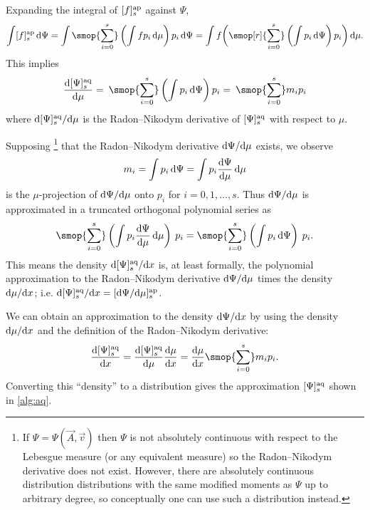 Expanding the integral of \(  \ff[a]{f}{s} \) against \( \Psi \), 
\begin{equation*}
    \int \ff[a]{f}{s} \,\d\Psi
    = \int \smop{\sum_{i=0}^{s}} \left(\int f p_i \,\d\mu\right) p_i \,\d\Psi
    = \int f  \bigg( \smop[r]{\sum_{i=0}^{s}} \left(\int p_i \,\d\Psi\right) p_i \bigg) \,\d\mu.
\end{equation*}
This implies 
\begin{equation*}
    \frac{\d\qq[a]{\Psi}{s}}{\d\mu} 
    = \:\smop{\sum_{i=0}^{s}} \left( \int p_i \,\d\Psi \right) p_i 
    = \:\smop{\sum_{i=0}^{s}} m_i p_i 
\end{equation*}
where \( \d\qq[a]{\Psi}{s}/\d\mu \) is the Radon--Nikodym derivative of \( \qq[a]{\Psi}{s} \) with respect to \( \mu \).


Supposing%
\footnote{If \( \Psi = \Psi(\vec{A},\vec{v}) \) then \( \Psi \) is not absolutely continuous with respect to the Lebesgue measure (or any equivalent measure) so the Radon--Nikodym derivative does not exist. 
However, there are absolutely continuous distribution distributions with the same modified moments as \( \Psi \) up to arbitrary degree, so conceptually one can use such a distribution instead.}
that the Radon--Nikodym derivative \( \textup{d}\Psi/\textup{d}\mu \) exists, we observe 
\begin{equation*}
    m_i = \int p_i \,\textup{d}\Psi
    = \int p_i \frac{\textup{d}\Psi}{\textup{d}\mu} \,\textup{d}\mu
\end{equation*}
is the \( \mu \)-projection of \( \textup{d}\Psi/\textup{d}\mu \) onto \( p_i \) for \( i=0,1,\ldots, s \). 
Thus \( \textup{d}\Psi/\textup{d}\mu \) is approximated in a truncated orthogonal polynomial series as
\begin{equation*}
    \smop{\sum_{i=0}^{s}} \left( \int p_i \frac{\d\Psi}{\d\mu} \,\d\mu \right) \: p_i
    =
    \smop{\sum_{i=0}^{s}} \left( \int p_i \,\d\Psi \right) \: p_i.
\end{equation*}
This means the density \( \d\qq[a]{\Psi}{s}/\d{x} \) is, at least formally, the polynomial approximation to the Radon--Nikodym derivative \( \textup{d}\Psi/\textup{d}\mu \) times the density \( \textup{d}\mu/\textup{d}{x} \); i.e. \( \d\qq[a]{\Psi}{s}/\d{x} = \ff[a]{\d\Psi/\d\mu}{s} \).

We can obtain an approximation to the density \( \textup{d}\Psi/\textup{d}{x} \) by using the density \( \textup{d}\mu/\textup{d}{x} \) and the definition of the Radon--Nikodym derivative: 
\begin{equation*}
    \frac{\d\qq[a]{\Psi}{s}}{\d{x}} 
    =  \frac{\d\qq[a]{\Psi}{s}}{\d\mu}  \frac{\d\mu}{\d{x}}
    = \frac{\d\mu}{\d{x}} \smop{\sum_{i=0}^{s}} m_i p_i.
\end{equation*}
Converting this ``density'' to a distribution gives the approximation \( \qq[a]{\Psi}{s} \) shown in \cref{alg:aq}. 

